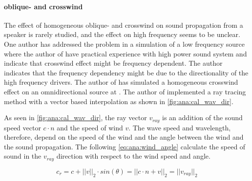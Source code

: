 \paragraph{oblique- and crosswind} The effect of homogeneous oblique- and crosswind on sound propagation from a speaker is rarely studied, and the effect on high frequency seems to be unclear. One author has addressed the problem in a simulation of a low frequency source \citep{crosswind_simulation} where the author of  \citep{BALLOU2008xi} have practical experience with high power sound system and indicate that crosswind effect might be frequency dependent.   The author indicates that the frequency dependency might be due to the directionality of the high frequency drivers. The author of \citep{crosswind_simulation} has simulated a homogeneous crosswind effect on an omnidirectional source at . The author of \citep{ray_tracing} implemented a ray tracing method with a vector based interpolation as shown in \autoref{fig:ana:cal_wav_dir}.



\startexplain
{}
\stopexplain

As seen in \autoref{fig:ana:cal_wav_dir}, the ray vector $v_{ray}$ is an addition of the sound speed vector $c \cdot n$ and the speed of wind $v$. The wave speed and wavelength, therefore, depend on the speed of the wind and the angle between the wind and the sound propagation. The following \autoref{eq:ana:wind_angle} calculate the speed of sound in the $v_{ray}$ direction with respect to the wind speed and angle.



\begin{equation}\label{eq:ana:wind_angle}
c_r = c+||v||_2 \cdot sin(\theta) = ||c \cdot n + v||_2 = ||v_{ray}||_2
\end{equation}

\startexplain
{}
\stopexplain



